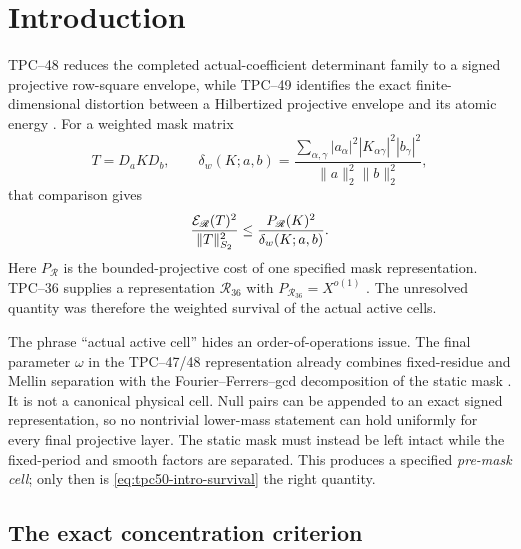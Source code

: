 \section{Introduction}
\label{sec:tpc50-introduction}

TPC--48 reduces the completed actual-coefficient determinant family to
a signed projective row-square envelope, while TPC--49 identifies the
exact finite-dimensional distortion between a Hilbertized projective
envelope and its atomic energy \citep{WangTPC48,WangTPC49}.  For a
weighted mask matrix
\begin{equation}
 T=D_aKD_b,
 \qquad
 \delta_w(K;a,b)
 =\frac{\sum_{\alpha,\gamma}|a_\alpha|^2
       |K_{\alpha\gamma}|^2|b_\gamma|^2}
       {\|a\|_2^2\|b\|_2^2},
 \label{eq:tpc50-intro-survival}
\end{equation}
that comparison gives
\begin{equation}
 \frac{\mathcal E_{\mathscr R}(T)^2}{\|T\|_{S_2}^2}
 \le \frac{P_{\mathscr R}(K)^2}
          {\delta_w(K;a,b)}.
 \label{eq:tpc50-intro-transfer}
\end{equation}
Here \(P_{\mathscr R}\) is the bounded-projective cost of one specified
mask representation.  TPC--36 supplies a representation
\(\mathscr R_{36}\) with \(P_{\mathscr R_{36}}=X^{o(1)}\)
\citep{WangTPC36}.  The unresolved quantity was therefore the weighted
survival of the actual active cells.

The phrase ``actual active cell'' hides an order-of-operations issue.
The final parameter \(\omega\) in the TPC--47/48 representation already
combines fixed-residue and Mellin separation with the
Fourier--Ferrers--gcd decomposition of the static mask
\citep{WangTPC47,WangTPC48}.  It is not a canonical physical cell.
Null pairs can be appended to an exact signed representation, so no
nontrivial lower-mass statement can hold uniformly for every final
projective layer.  The static mask must instead be left intact while
the fixed-period and smooth factors are separated.  This produces a
specified \emph{pre-mask cell}; only then is
\eqref{eq:tpc50-intro-survival} the right quantity.

\subsection{The exact concentration criterion}

